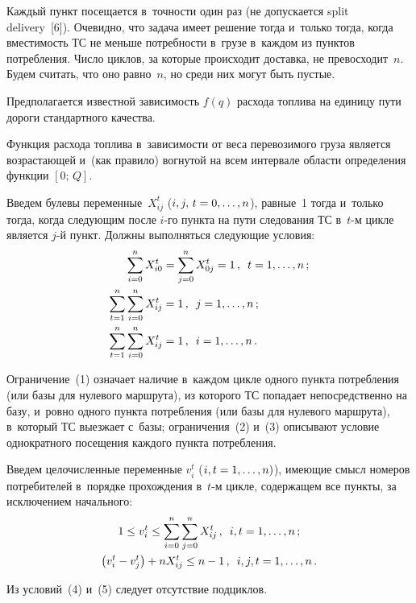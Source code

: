 \begin{multicols}{2}
  Каждый пункт посещается в~точности один раз (не допускается split
delivery~[6]). Очевидно, что задача имеет решение тогда и~только тогда, когда
вместимость ТС не меньше потребности в~грузе в~каждом из пунктов
потребления. Число циклов, за которые происходит доставка, не
превосходит~$n$. Будем считать, что оно равно~$n$, но среди них могут быть
пустые.

  Предполагается известной зависимость $f(q)$ расхода топлива на единицу
пути дороги стандартного качества.

  Функция расхода топлива в~зависимости от веса перевозимого груза
является возрастающей и~(как правило) вогнутой на всем интервале области
определения функции  $[0;\,Q]$.

  Введем булевы переменные~$X_{ij}^t$ ($i,j,\,t\hm=0, \ldots , n$), равные~1
тогда и~только тогда, когда следующим после $i$-го пункта на пути
следования ТС в~$t$-м цикле является $j$-й пункт. Должны выполняться
следующие условия:
  \begin{align}
  \sum\limits_{i=0}^n X^t_{i0} &= \sum\limits_{j=0}^n X^t_{0j} =1\,,\enskip
t=1,\ldots ,n\,;\label{e1-br}\\
  \sum\limits_{t=1}^n \sum\limits_{i=0}^n X_{ij}^t &=1\,,\enskip j=1,\ldots,
n\,;\label{e2-br}\\
  \sum\limits_{t=1}^n \sum\limits_{i=0}^n X_{ij}^t &=1\,,\enskip i=1,\ldots, n\,.
  \label{e3-br}
  \end{align}

  Ограничение~(1) означает наличие в~каждом цик\-ле одного пункта
потребления (или базы для нулевого маршрута), из которого ТС попадает
непосредственно на базу, и~ровно одного пункта потребления (или базы для
нулевого маршрута), в~который ТС выезжает с~базы; ограничения~(2) и~(3)
описывают условие однократного посещения каж\-до\-го пункта потребления.

  Введем целочисленные переменные  $v_i^t$ ($i,t\hm=1,\ldots ,n)$), имеющие
смысл номеров потребителей в~порядке прохождения в~$t$-м цикле,
содержащем все пункты, за исключением начального:
  \begin{gather}
  1\leq v_i^t \leq \sum\limits_{i=0}^n \sum\limits_{j=0}^n X_{ij}^t\,, \enskip
i,t=1,\ldots, n\,;\label{e4-br}\\
  \left( v_i^t -v_j^t\right) +nX^t_{ij} \leq n-1\,,\enskip i,j,t=1,\ldots, n\,.
  \label{e5-br}
  \end{gather}

  Из условий~(4) и~(5) следует отсутствие под\-цик\-лов.


\end{multicols}

